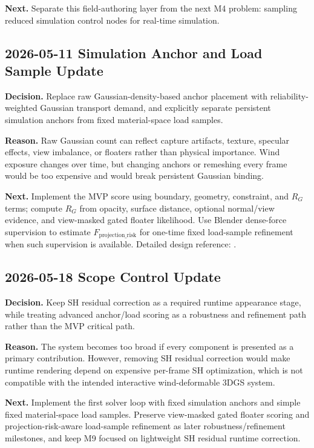 \documentclass[11pt]{article}
\begin{document}
\textbf{Next.} Separate this field-authoring layer from the next M4 problem: sampling reduced simulation control nodes for real-time simulation.

\subsection*{2026-05-11 Simulation Anchor and Load Sample Update}

\textbf{Decision.} Replace raw Gaussian-density-based anchor placement with reliability-weighted Gaussian transport demand, and explicitly separate persistent simulation anchors from fixed material-space load samples.

\textbf{Reason.} Raw Gaussian count can reflect capture artifacts, texture, specular effects, view imbalance, or floaters rather than physical importance. Wind exposure changes over time, but changing anchors or remeshing every frame would be too expensive and would break persistent Gaussian binding.

\textbf{Next.} Implement the MVP score using boundary, geometry, constraint, and \(R_G\) terms; compute \(R_G\) from opacity, surface distance, optional normal/view evidence, and view-masked gated floater likelihood. Use Blender dense-force supervision to estimate \(F_{\mathrm{projection\_risk}}\) for one-time fixed load-sample refinement when such supervision is available. Detailed design reference: .

\subsection*{2026-05-18 Scope Control Update}

\textbf{Decision.} Keep SH residual correction as a required runtime appearance stage, while treating advanced anchor/load scoring as a robustness and refinement path rather than the MVP critical path.

\textbf{Reason.} The system becomes too broad if every component is presented as a primary contribution. However, removing SH residual correction would make runtime rendering depend on expensive per-frame SH optimization, which is not compatible with the intended interactive wind-deformable 3DGS system.

\textbf{Next.} Implement the first solver loop with fixed simulation anchors and simple fixed material-space load samples. Preserve view-masked gated floater scoring and projection-risk-aware load-sample refinement as later robustness/refinement milestones, and keep M9 focused on lightweight SH residual runtime correction.
\end{document}

